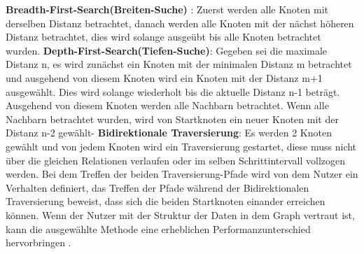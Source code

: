 \textbf {Breadth-First-Search(Breiten-Suche)} : Zuerst werden alle Knoten mit derselben Distanz betrachtet, danach werden alle Knoten mit der nächst höheren Distanz betrachtet, dies wird solange ausgeübt bis alle Knoten betrachtet wurden. \newline
\textbf {Depth-First-Search(Tiefen-Suche)}: Gegeben sei die maximale Distanz n, es wird zunächst ein Knoten mit der minimalen Distanz m betrachtet und ausgehend von diesem Knoten wird ein Knoten mit der Distanz m+1 ausgewählt. Dies wird solange wiederholt bis die aktuelle Distanz n-1 beträgt. Ausgehend von diesem Knoten werden alle Nachbarn betrachtet. Wenn alle Nachbarn betrachtet wurden, wird von Startknoten ein neuer Knoten mit der Distanz n-2 gewählt- \newline
\textbf {Bidirektionale Traversierung}: Es werden 2 Knoten gewählt und von jedem Knoten wird ein Traversierung gestartet, diese muss nicht über die gleichen Relationen verlaufen oder im selben Schrittintervall vollzogen werden. Bei dem Treffen der beiden Traversierung-Pfade wird von dem Nutzer ein Verhalten definiert, das Treffen der Pfade während der Bidirektionalen Traversierung beweist, dass sich die beiden Startknoten einander erreichen können.
\newline
\newline
Wenn der Nutzer mit der Struktur der Daten in dem Graph vertraut ist, kann die ausgewählte Methode eine erheblichen Performanzunterschied  hervorbringen \parencite{vukotic2015neo4j}. 

